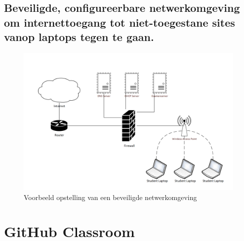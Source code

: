 	
	
\newpage

\subsection{Beveiligde, configureerbare netwerkomgeving om internettoegang tot niet-toegestane sites vanop laptops tegen te gaan.	}

	\begin{figure}
	\includegraphics[width=\linewidth]{img/OpstellingNWOMG}
	\caption{Voorbeeld opstelling van een beveiligde netwerkomgeving}
	\label{fig:Omgeving1}
\end{figure}
\section{GitHub Classroom}
\label{sec:GHC}


